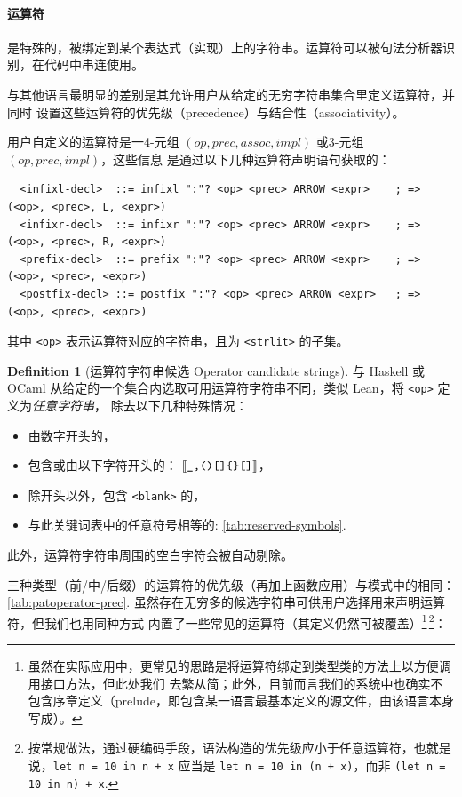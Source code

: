 \documentclass[a4paper, 11pt]{article}
\theoremstyle{remark}\newtheorem*{remark}{Remark}
\theoremstyle{definition}\newtheorem*{definition}{Definition}
\begin{document}
\paragraph{运算符} 是特殊的，被绑定到某个表达式（实现）上的字符串。运算符可以被句法分析器识别，在代码中串连使用。

\Tigris 与其他语言最明显的差别是其允许用户从给定的无穷字符串集合里定义运算符，并同时
设置这些运算符的优先级（precedence）与结合性（associativity）。

用户自定义的运算符是一4-元组 \((op, prec, assoc, impl)\) 或3-元组 \((op, prec, impl)\)，这些信息
是通过以下几种运算符声明语句获取的：
\begin{verbatim}
  <infixl-decl>  ::= infixl ":"? <op> <prec> ARROW <expr>    ; => (<op>, <prec>, L, <expr>)
  <infixr-decl>  ::= infixr ":"? <op> <prec> ARROW <expr>    ; => (<op>, <prec>, R, <expr>)
  <prefix-decl>  ::= prefix ":"? <op> <prec> ARROW <expr>    ; => (<op>, <prec>, <expr>)
  <postfix-decl> ::= postfix ":"? <op> <prec> ARROW <expr>   ; => (<op>, <prec>, <expr>)
\end{verbatim}
其中 \texttt{<op>} 表示运算符对应的字符串，且为 \texttt{<strlit>} 的子集。
\begin{definition}[运算符字符串候选 Operator candidate strings]
  与 Haskell 或 OCaml 从给定的一个集合内选取可用运算符字符串不同，类似 Lean，\Tigris 将 \texttt{<op>} 定义为\emph{任意字符串}，
  除去以下几种特殊情况：
  \begin{itemize}
    \item 由数字开头的，
    \item 包含或由以下字符开头的： \(\llbracket \texttt{\_,()[]\{\}[]} \rrbracket\)，
    \item 除开头以外，包含 \texttt{<blank>} 的，
    \item 与此关键词表中的任意符号相等的: \autoref{tab:reserved-symbols}.
  \end{itemize}
  此外，运算符字符串周围的空白字符会被自动剔除。
\end{definition}
三种类型（前/中/后缀）的运算符的优先级（再加上函数应用）与模式中的相同：\autoref{tab:patoperator-prec}.
虽然存在无穷多的候选字符串可供用户选择用来声明运算符，但我们也用同种方式
内置了一些常见的运算符（其定义仍然可被覆盖）\footnote{
  虽然在实际应用中，更常见的思路是将运算符绑定到类型类的方法上以方便调用接口方法，但此处我们
  去繁从简；此外，目前而言我们的系统中也确实不包含序章定义（prelude，即包含某一语言最基本定义的源文件，由该语言本身写成）。
}\,\footnote{
  按常规做法，通过硬编码手段，语法构造的优先级应小于任意运算符，也就是说，\texttt{let n = 10 in n + x}
  应当是 \texttt{let n = 10 in (n + x)}，而非 \texttt{(let n = 10 in n) + x}.
}：
\end{document}
